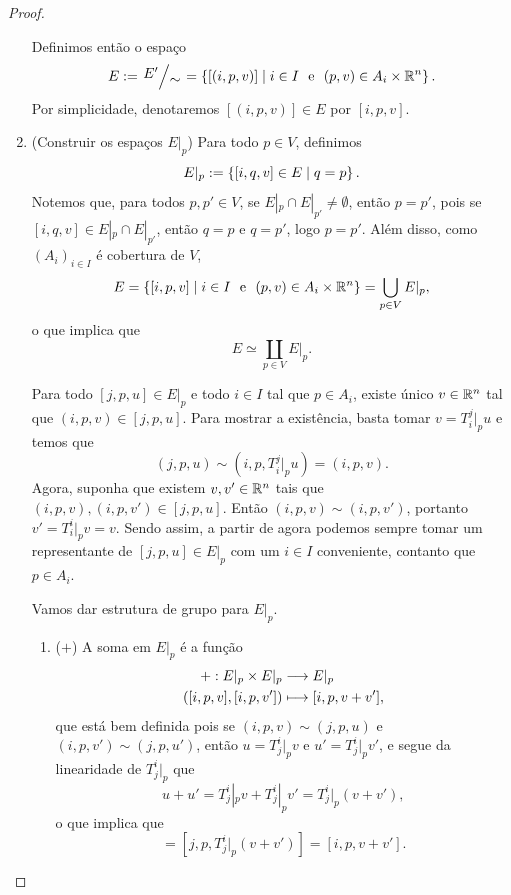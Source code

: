 \begin{proof}
\begin{enumerate}
Definimos então o espaço
	\begin{equation*}
	E:= \quo{E'}{\sim} = \set{[(i,p,v)]}{i \in I \e (p,v) \in A_i \times \R^n}.
	\end{equation*}
Por simplicidade, denotaremos $[(i,p,v)] \in E$ por $[i,p,v]$.

\item (Construir os espaços $E|_p$) Para todo $p \in V$, definimos
	\begin{equation*}
	E|_p := \left\{[i,q,v] \in E \;\middle\vert\; q=p \right\}.
	\end{equation*}
Notemos que, para todos $p,p' \in V$, se $E|_p \cap E|_{p'} \neq \emptyset$, então $p=p'$, pois se $[i,q,v] \in E|_p \cap E|_{p'}$, então $q=p$ e $q=p'$, logo $p=p'$. Além disso, como $(A_i)_{i \in I}$ é cobertura de $V$,
	\begin{equation*}
	E = \left\{[i,p,v] \;\middle\vert\; i \in I \text{\ \ e\ \ } (p,v) \in A_i \times \mathbb{R}^n \right\} = \bigcup_{p \in V} E|_p,
	\end{equation*}
o que implica que
	\begin{equation*}
	E \simeq \coprod_{p \in V} E|_p.
	\end{equation*}

Para todo $[j,p,u] \in E|_p$ e todo $i \in I$ tal que $p \in A_i$, existe único $v \in \mathbb{R}^n$ tal que $(i,p,v) \in [j,p,u]$. Para mostrar a existência, basta tomar $v = T^j_i|_p u$ e temos que
	\begin{equation*}
	(j,p,u) \sim (i,p,T^j_i|_p u) = (i,p,v).
	\end{equation*}
Agora, suponha que existem $v,v' \in \mathbb{R}^n$ tais que $(i,p,v), (i,p,v') \in [j,p,u]$. Então $(i,p,v) \sim (i,p,v')$, portanto $v' = T^i_i|_p v = v$.	
Sendo assim, a partir de agora podemos sempre tomar um representante de $[j,p,u] \in E|_p$ com um $i \in I$ conveniente, contanto que $p \in A_i$.

Vamos dar estrutura de grupo para $E|_p$.
	\begin{enumerate}
	\item ($+$) A soma em $E|_p$ é a função
	\begin{align*}
	{+}: {E|_p \times E|_p} &\longrightarrow {E|_p} \\{([i,p,v] , [i,p,v'])} &\longmapsto {[i,p,v + v']},
	\end{align*}
que está bem definida pois se $(i,p,v) \sim (j,p,u)$ e $(i,p,v') \sim (j,p,u')$, então $u = T^i_j|_p v$ e $u' = T^i_j|_p v'$, e segue da linearidade de $T^i_j|_p$ que
	\begin{equation*}
	u + u' = T^i_j|_p v + T^i_j|_p v' = T^i_j|_p (v + v'),
	\end{equation*}
o que implica que
	\begin{equation*}
	[j,p,u + u'] = [j,p,T^i_j|_p (v + v')] = [i,p,v + v'].
	\end{equation*}


\end{enumerate}
\end{enumerate}
\end{proof}
